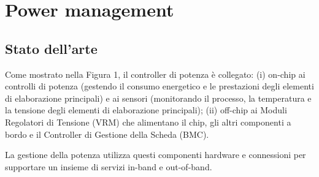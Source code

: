 \chapter{Power management}







\section{Stato dell'arte}

Come mostrato nella Figura 1, il controller di potenza è collegato: (i) on-chip ai controlli di potenza (gestendo il consumo energetico e le prestazioni degli elementi di elaborazione principali) e ai sensori (monitorando il processo, la temperatura e la tensione degli elementi di elaborazione principali); (ii) off-chip ai Moduli Regolatori di Tensione (VRM) che alimentano il chip, gli altri componenti a bordo e il Controller di Gestione della Scheda (BMC).

La gestione della potenza utilizza questi componenti hardware e connessioni per supportare un insieme di servizi in-band e out-of-band.

